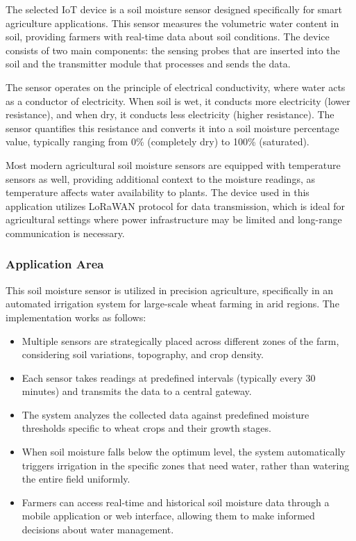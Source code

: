 \documentclass[12pt,a4paper]{article}
\begin{document}
The selected IoT device is a soil moisture sensor designed specifically for smart agriculture applications. This sensor measures the volumetric water content in soil, providing farmers with real-time data about soil conditions. The device consists of two main components: the sensing probes that are inserted into the soil and the transmitter module that processes and sends the data.

The sensor operates on the principle of electrical conductivity, where water acts as a conductor of electricity. When soil is wet, it conducts more electricity (lower resistance), and when dry, it conducts less electricity (higher resistance). The sensor quantifies this resistance and converts it into a soil moisture percentage value, typically ranging from 0\% (completely dry) to 100\% (saturated).

Most modern agricultural soil moisture sensors are equipped with temperature sensors as well, providing additional context to the moisture readings, as temperature affects water availability to plants. The device used in this application utilizes LoRaWAN protocol for data transmission, which is ideal for agricultural settings where power infrastructure may be limited and long-range communication is necessary.

\subsubsection{Application Area}
This soil moisture sensor is utilized in precision agriculture, specifically in an automated irrigation system for large-scale wheat farming in arid regions. The implementation works as follows:

\begin{itemize}
    \item Multiple sensors are strategically placed across different zones of the farm, considering soil variations, topography, and crop density.
    \item Each sensor takes readings at predefined intervals (typically every 30 minutes) and transmits the data to a central gateway.
    \item The system analyzes the collected data against predefined moisture thresholds specific to wheat crops and their growth stages.
    \item When soil moisture falls below the optimum level, the system automatically triggers irrigation in the specific zones that need water, rather than watering the entire field uniformly.
    \item Farmers can access real-time and historical soil moisture data through a mobile application or web interface, allowing them to make informed decisions about water management.
\end{itemize}
\end{document}
